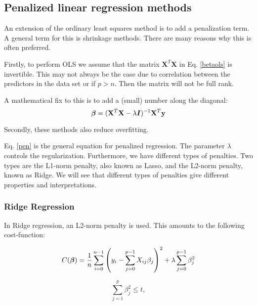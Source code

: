 
\subsection{Penalized linear regression methods}

An extension of the ordinary least squares method is to add a penalization term. A general term for this is shrinkage methods. There are many reasons why this is often preferred. 

Firstly, to perform OLS we assume that the matrix $\boldsymbol{X}^T\boldsymbol{X}$ in Eq. \ref{betaols} is invertible. This may not always be the case due to correlation between the predictors in the data set or if $p > n$. Then the matrix will not be full rank. 

A mathematical fix to this is to add a (small) number along the diagonal: 
\begin{equation}\label{pen}
    \boldsymbol{\beta} = (\mathbf{X}^T\mathbf{X}- \lambda\boldsymbol{I})^{-1}\mathbf{X}^T\mathbf{y}
\end{equation}

Secondly, these methods also reduce overfitting. 

Eq. \ref{pen} is the general equation for penalized regression. The parameter $\lambda$ controls the regularization. Furthermore, we have different types of penalties. Two types are the L1-norm penalty, also known as Lasso, and the L2-norm penalty, known as Ridge. We will see that different types of penalties give different properties and interpretations.

\subsubsection{Ridge Regression}

In Ridge regression, an L2-norm penalty is used. This amounts to the following cost-function: 

\begin{equation}
     C(\boldsymbol{\beta}) = \frac{1}{n} \sum_{i=0}^{n-1} \left( y_i - \sum_{j=0}^{p-1} X_{ij}\beta_j \right)^2 + \lambda\sum_{j=0}^{p-1} \beta_j^2 
\end{equation}



\begin{equation}
    \sum_{j=1}^p \beta_j^2 \leq t, 
\end{equation}

